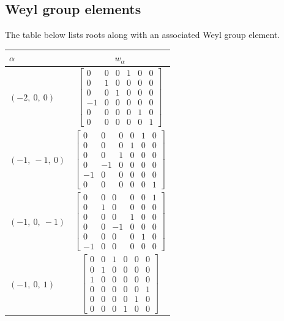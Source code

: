 \documentclass[11pt]{article}
\newcommand{\noi}{\noindent}
\theoremstyle{definition}
\begin{document}
\subsection{Weyl group elements}

\noi The table below lists roots along with an associated Weyl group element.

\bigskip

\noi \noindent \begin{longtable}{|l|c|}
    \hline
    $\alpha$ & $w_\alpha$ \\
    \hline
    \endhead
    $\left( -2, \  0, \  0\right)$ & ${\left[\begin{matrix}0 & 0 & 0 & 1 & 0 & 0\\0 & 1 & 0 & 0 & 0 & 0\\0 & 0 & 1 & 0 & 0 & 0\\-1 & 0 & 0 & 0 & 0 & 0\\0 & 0 & 0 & 0 & 1 & 0\\0 & 0 & 0 & 0 & 0 & 1\end{matrix}\right]}$ \\
    \hline
    $\left( -1, \  -1, \  0\right)$ & ${\left[\begin{matrix}0 & 0 & 0 & 0 & 1 & 0\\0 & 0 & 0 & 1 & 0 & 0\\0 & 0 & 1 & 0 & 0 & 0\\0 & -1 & 0 & 0 & 0 & 0\\-1 & 0 & 0 & 0 & 0 & 0\\0 & 0 & 0 & 0 & 0 & 1\end{matrix}\right]}$ \\
    \hline
    $\left( -1, \  0, \  -1\right)$ & ${\left[\begin{matrix}0 & 0 & 0 & 0 & 0 & 1\\0 & 1 & 0 & 0 & 0 & 0\\0 & 0 & 0 & 1 & 0 & 0\\0 & 0 & -1 & 0 & 0 & 0\\0 & 0 & 0 & 0 & 1 & 0\\-1 & 0 & 0 & 0 & 0 & 0\end{matrix}\right]}$ \\
    \hline
    $\left( -1, \  0, \  1\right)$ & ${\left[\begin{matrix}0 & 0 & 1 & 0 & 0 & 0\\0 & 1 & 0 & 0 & 0 & 0\\1 & 0 & 0 & 0 & 0 & 0\\0 & 0 & 0 & 0 & 0 & 1\\0 & 0 & 0 & 0 & 1 & 0\\0 & 0 & 0 & 1 & 0 & 0\end{matrix}\right]}$ \\

\end{longtable}
\end{document}
